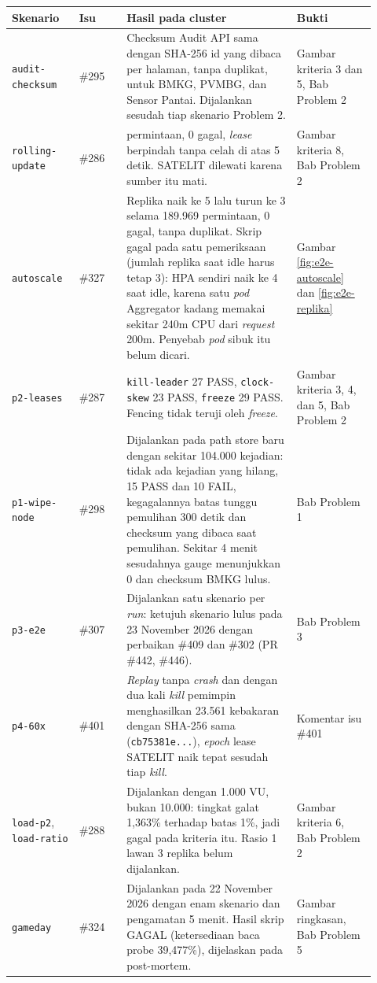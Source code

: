 \begin{longtable}[]{|>{\raggedright\arraybackslash}p{0.17\linewidth}|>{\raggedright\arraybackslash}p{0.12\linewidth}|>{\raggedright\arraybackslash}p{0.43\linewidth}|>{\raggedright\arraybackslash}p{0.2\linewidth}|}
\hline
\textbf{Skenario} & \textbf{Isu} & \textbf{Hasil pada cluster} & \textbf{Bukti} \\
\hline
\endhead
\texttt{audit-checksum} & \#295 & Checksum Audit API sama dengan SHA-256 id yang dibaca per halaman, tanpa duplikat, untuk BMKG, PVMBG, dan Sensor Pantai. Dijalankan sesudah tiap skenario Problem 2. & Gambar kriteria 3 dan 5, Bab Problem 2 \\
\hline
\texttt{rolling-update} & \#286 & 3.849 permintaan, 0 gagal, \textit{lease} berpindah tanpa celah di atas 5 detik. SATELIT dilewati karena sumber itu mati. & Gambar kriteria 8, Bab Problem 2 \\
\hline
\texttt{autoscale} & \#327 & Replika naik ke 5 lalu turun ke 3 selama 189.969 permintaan, 0 gagal, tanpa duplikat. Skrip gagal pada satu pemeriksaan (jumlah replika saat idle harus tetap 3): HPA sendiri naik ke 4 saat idle, karena satu \textit{pod} Aggregator kadang memakai sekitar 240m CPU dari \textit{request} 200m. Penyebab \textit{pod} sibuk itu belum dicari. & Gambar \ref{fig:e2e-autoscale} dan \ref{fig:e2e-replika} \\
\hline
\texttt{p2-leases} & \#287 & \texttt{kill-leader} 27 PASS, \texttt{clock-skew} 23 PASS, \texttt{freeze} 29 PASS. Fencing tidak teruji oleh \textit{freeze}. & Gambar kriteria 3, 4, dan 5, Bab Problem 2 \\
\hline
\texttt{p1-wipe-node} & \#298 & Dijalankan pada path store baru dengan sekitar 104.000 kejadian: tidak ada kejadian yang hilang, 15 PASS dan 10 FAIL, kegagalannya batas tunggu pemulihan 300 detik dan checksum yang dibaca saat pemulihan. Sekitar 4 menit sesudahnya gauge menunjukkan 0 dan checksum BMKG lulus. & Bab Problem 1 \\
\hline
\texttt{p3-e2e} & \#307 & Dijalankan satu skenario per \textit{run}: ketujuh skenario lulus pada 23 November 2026 dengan perbaikan \#409 dan \#302 (PR \#442, \#446). & Bab Problem 3 \\
\hline
\texttt{p4-60x} & \#401 & \textit{Replay} tanpa \textit{crash} dan dengan dua kali \textit{kill} pemimpin menghasilkan 23.561 kebakaran dengan SHA-256 sama (\texttt{cb75381e...}), \textit{epoch} lease SATELIT naik tepat sesudah tiap \textit{kill}. & Komentar isu \#401 \\
\hline
\texttt{load-p2}, \texttt{load-ratio} & \#288 & Dijalankan dengan 1.000 VU, bukan 10.000: tingkat galat 1,363\% terhadap batas 1\%, jadi gagal pada kriteria itu. Rasio 1 lawan 3 replika belum dijalankan. & Gambar kriteria 6, Bab Problem 2 \\
\hline
\texttt{gameday} & \#324 & Dijalankan pada 22 November 2026 dengan enam skenario dan pengamatan 5 menit. Hasil skrip GAGAL (ketersediaan baca probe 39,477\%), dijelaskan pada post-mortem. & Gambar ringkasan, Bab Problem 5 \\
\hline
\end{longtable}

